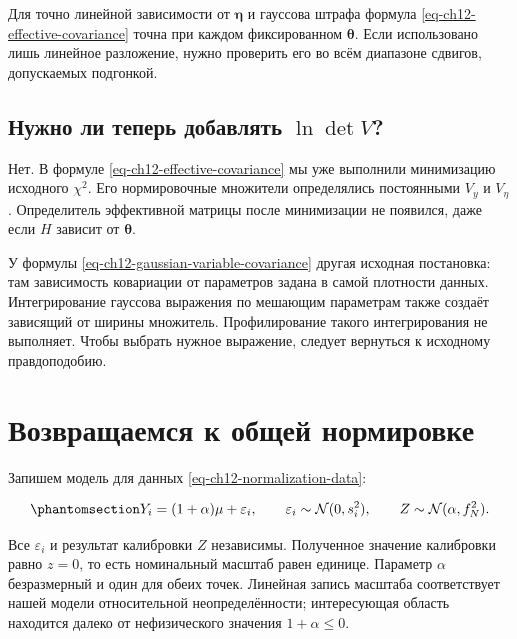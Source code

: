 \documentclass[
  russian,
  11pt,
  a4paper,
  open=any]{scrbook}
\begin{document}
Для точно линейной зависимости от \(\boldsymbol\eta\) и гауссова штрафа
формула \ref{eq-ch12-effective-covariance} точна при каждом
фиксированном \(\boldsymbol\theta\). Если использовано лишь линейное
разложение, нужно проверить его во всём диапазоне сдвигов, допускаемых
подгонкой.

\subsection{\texorpdfstring{Нужно ли теперь добавлять
\(\ln\det V\)?}{Нужно ли теперь добавлять \textbackslash ln\textbackslash det V?}}\label{ux43dux443ux436ux43dux43e-ux43bux438-ux442ux435ux43fux435ux440ux44c-ux434ux43eux431ux430ux432ux43bux44fux442ux44c-lndet-v}

Нет. В формуле \ref{eq-ch12-effective-covariance} мы уже выполнили
минимизацию исходного \(\chi^2\). Его нормировочные множители
определялись постоянными \(V_y\) и \(V_\eta\). Определитель эффективной
матрицы после минимизации не появился, даже если \(H\) зависит от
\(\boldsymbol\theta\).

У формулы \ref{eq-ch12-gaussian-variable-covariance} другая исходная
постановка: там зависимость ковариации от параметров задана в самой
плотности данных. Интегрирование гауссова выражения по мешающим
параметрам также создаёт зависящий от ширины множитель. Профилирование
такого интегрирования не выполняет. Чтобы выбрать нужное выражение,
следует вернуться к исходному правдоподобию.

\section{Возвращаемся к общей
нормировке}\label{ux432ux43eux437ux432ux440ux430ux449ux430ux435ux43cux441ux44f-ux43a-ux43eux431ux449ux435ux439-ux43dux43eux440ux43cux438ux440ux43eux432ux43aux435}

Запишем модель для данных \ref{eq-ch12-normalization-data}:

\begin{equation}\protect\phantomsection\label{eq-ch12-normalization-measurement-model}{
Y_i=(1+\alpha)\mu+\varepsilon_i,
\qquad
\varepsilon_i\sim\mathcal N(0,s_i^2),
\qquad
Z\sim\mathcal N(\alpha,f_N^2).
}\end{equation}

Все \(\varepsilon_i\) и результат калибровки \(Z\) независимы.
Полученное значение калибровки равно \(z=0\), то есть номинальный
масштаб равен единице. Параметр \(\alpha\) безразмерный и один для обеих
точек. Линейная запись масштаба соответствует нашей модели относительной
неопределённости; интересующая область находится далеко от нефизического
значения \(1+\alpha\le0\).
\end{document}
